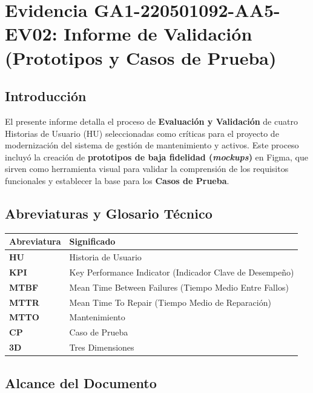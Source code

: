 \clearpage
\chapter*{Evidencia GA1-220501092-AA5-EV02: Informe de Validación (Prototipos y Casos de Prueba)}
{}
\setcounter{section}{0}

\section{Introducción}

El presente informe detalla el proceso de \textbf{Evaluación y Validación} de cuatro Historias de Usuario (HU) seleccionadas como críticas para el proyecto de modernización del sistema de gestión de mantenimiento y activos. Este proceso incluyó la creación de \textbf{prototipos de baja fidelidad (\textit{mockups})} en Figma, que sirven como herramienta visual para validar la comprensión de los requisitos funcionales y establecer la base para los \textbf{Casos de Prueba}.

\section{Abreviaturas y Glosario Técnico}

\begin{center}
\begin{tabular}{|l|p{10cm}|}
\hline
\textbf{Abreviatura} & \textbf{Significado} \\ \hline
\textbf{HU} & Historia de Usuario \\ \hline
\textbf{KPI} & Key Performance Indicator (Indicador Clave de Desempeño) \\ \hline
\textbf{MTBF} & Mean Time Between Failures (Tiempo Medio Entre Fallos) \\ \hline
\textbf{MTTR} & Mean Time To Repair (Tiempo Medio de Reparación) \\ \hline
\textbf{MTTO} & Mantenimiento \\ \hline
\textbf{CP} & Caso de Prueba \\ \hline
\textbf{3D} & Tres Dimensiones \\ \hline
\end{tabular}
\end{center}

\section{Alcance del Documento}

